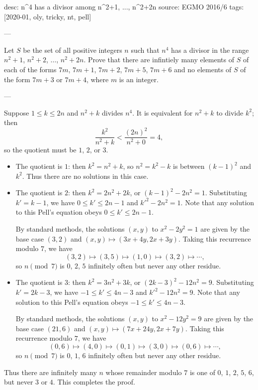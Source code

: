 desc: n^4 has a divisor among n^2+1, ..., n^2+2n
source: EGMO 2016/6
tags: [2020-01, oly, tricky, nt, pell]

---

Let $S$ be the set of all positive integers $n$ such that $n^4$ has a divisor in the range $n^2+1$, $n^2+2$, $\ldots$, $n^2+2n$. Prove that there are infintiely many elements of $S$ of each of the forms $7m$, $7m+1$, $7m+2$, $7m+5$, $7m+6$ and no elements of $S$ of the form $7m+3$ or $7m+4$, where $m$ is an integer.

---

Suppose $1\le k\le 2n$ and $n^2+k$ divides $n^4$. It is equivalent for $n^2+k$ to divide $k^2$; then \[\frac{k^2}{n^2+k}<\frac{(2n)^2}{n^2+0}=4,\]
so the quotient must be $1$, $2$, or $3$.
\begin{itemize}
    \item The quotient is $1$: then $k^2=n^2+k$, so $n^2=k^2-k$ is between $(k-1)^2$ and $k^2$. Thus there are no solutions in this case.
    \item The quotient is $2$: then $k^2=2n^2+2k$, or $(k-1)^2-2n^2=1$. Substituting $k'=k-1$, we have $0\le k'\le2n-1$ and $k'^2-2n^2=1$. Note that any solution to this Pell's equation obeys $0\le k'\le2n-1$.

        By standard methods, the solutions $(x,y)$ to $x^2-2y^2=1$ are given by the base case $(3,2)$ and $(x,y)\mapsto(3x+4y,2x+3y)$. Taking this recurrence modulo $7$, we have \[(3,2)\mapsto(3,5)\mapsto(1,0)\mapsto(3,2)\mapsto\cdots,\]
        so $n\pmod7$ is $0$, $2$, $5$ infinitely often but never any other residue.
    \item The quotient is $3$: then $k^2=3n^2+3k$, or $(2k-3)^2-12n^2=9$. Substituting $k'=2k-3$, we have $-1\le k'\le4n-3$ and $k'^2-12n^2=9$. Note that any solution to this Pell's equation obeys $-1\le k'\le4n-3$.

        By standard methods, the solutions $(x,y)$ to $x^2-12y^2=9$ are given by the base case $(21,6)$ and $(x,y)\mapsto(7x+24y,2x+7y)$. Taking this recurrence modulo $7$, we have \[(0,6)\mapsto(4,0)\mapsto(0,1)\mapsto(3,0)\mapsto(0,6)\mapsto\cdots,\]
        so $n\pmod7$ is $0$, $1$, $6$ infinitely often but never any other residue.
\end{itemize}
Thus there are infinitely many $n$ whose remainder modulo $7$ is one of $0$, $1$, $2$, $5$, $6$, but never $3$ or $4$. This completes the proof.
